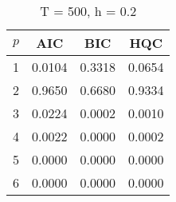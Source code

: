 \begin{table}[ht]
\captionsetup{justification=raggedright,singlelinecheck=false}
\caption*{T = 500, h = 0.2}
\begin{tabular}{c|ccc}
  $p$ & AIC & BIC & HQC \\\hline
  1 & 0.0104 & 0.3318 & 0.0654 \\
  2 & 0.9650 & 0.6680 & 0.9334 \\
  3 & 0.0224 & 0.0002 & 0.0010 \\
  4 & 0.0022 & 0.0000 & 0.0002 \\
  5 & 0.0000 & 0.0000 & 0.0000 \\
  6 & 0.0000 & 0.0000 & 0.0000 \\
\end{tabular}
\end{table}
